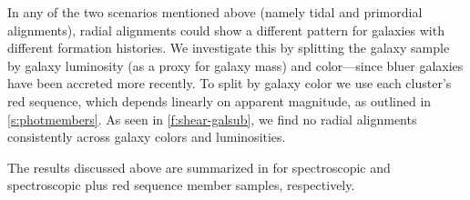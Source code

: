In any of the two scenarios mentioned above (namely tidal and primordial alignments), radial 
alignments could show a different pattern for galaxies with different formation histories. We 
investigate this by splitting the galaxy sample by galaxy luminosity (as a proxy for galaxy mass) 
and color---since bluer galaxies have been accreted more recently. To split by galaxy color we use 
each cluster's red sequence, which depends linearly on apparent magnitude, as outlined in 
\cref{s:photmembers}. As seen in \cref{f:shear-galsub}, we find no radial alignments consistently 
across galaxy colors and luminosities.

The results discussed above are summarized in  for spectroscopic and 
spectroscopic plus red sequence member samples, respectively.

\afterpage{
\begin{landscape}


\end{landscape}}
